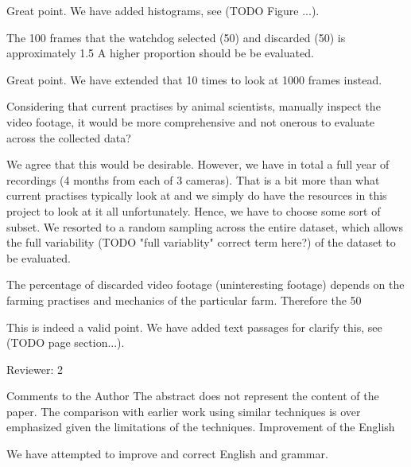 \documentclass[10pt,a4paper]{letter}
\begin{document}
\begin{letter}{}
Great point. We have added histograms, see (TODO Figure ...).

\begin{siderules}
The 100 frames that the watchdog selected (50) and discarded (50) is approximately 1.5%
A higher proportion should be be evaluated. 
\end{siderules}

Great point. We have extended that 10 times to look at 1000 frames instead.

\begin{siderules}
Considering that current practises by animal scientists, manually inspect the video footage, it would be more 
comprehensive and not onerous to evaluate across the collected data?
\end{siderules}

We agree that this would be desirable. However, we have in total a full year of recordings (4 months from each of 3 cameras). 
That is a bit more than what current practises typically look at and
we simply do have the resources in this project to look at it all unfortunately. 
Hence, we have to choose some sort of subset. We resorted to a random sampling across the
entire dataset, which allows the full variability (TODO "full variablity" correct term here?) of the dataset to be evaluated.

\begin{siderules}
The percentage of discarded video footage (uninteresting footage) depends on the farming practises and mechanics of the particular farm. Therefore the 50%
\end{siderules}

This is indeed a valid point. We have added text passages for clarify this, see (TODO page section...).

\begin{siderules}
Reviewer: 2

Comments to the Author
The abstract does not represent the content of the paper.
The comparison with earlier work using similar techniques is over emphasized given the limitations
of the techniques.
Improvement of the English
\end{siderules}

We have attempted to improve and correct English and grammar.


\end{letter}
\end{document}
